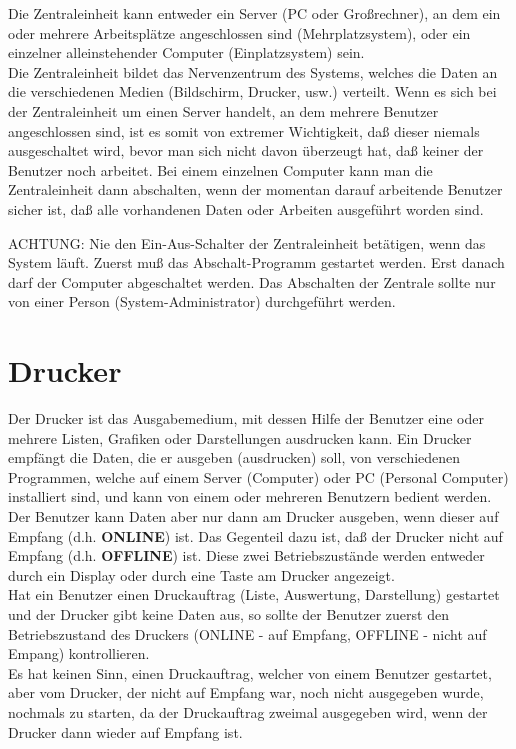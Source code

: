 Die Zentraleinheit kann entweder ein Server (PC oder Gro{\ss}rechner), an
dem ein oder mehrere Arbeitspl\"{a}tze angeschlossen sind (Mehrplatzsystem),
oder ein einzelner alleinstehender Computer (Einplatzsystem) sein.\\
Die Zentraleinheit bildet das Nervenzentrum des Systems, welches
die Daten an die verschiedenen Medien (Bildschirm, Drucker, usw.)
verteilt. Wenn es sich bei der Zentraleinheit um einen Server handelt, an dem
mehrere Benutzer angeschlossen sind, ist es somit von extremer Wichtigkeit, da{\ss} dieser niemals ausgeschaltet wird, bevor
man sich nicht davon \"{u}berzeugt hat, da{\ss} keiner der Benutzer noch
arbeitet. Bei einem einzelnen Computer kann man die Zentraleinheit
dann abschalten, wenn  der momentan darauf arbeitende Benutzer
sicher ist, da{\ss} alle vorhandenen Daten oder Arbeiten ausgef\"{u}hrt
worden sind.

\vspace{0.5cm}

\begin{bf}
\begin{it}
ACHTUNG: Nie den Ein-Aus-Schalter der Zentraleinheit bet\"{a}tigen, wenn
das System l\"{a}uft. Zuerst mu{\ss} das Abschalt-Programm gestartet werden.
Erst danach darf der Computer abgeschaltet werden. Das Abschalten der
Zentrale sollte nur von einer Person (System-Administrator) durchgef\"{u}hrt
werden.
\end{it}
\end{bf}

\section{Drucker} 

Der Drucker ist das Ausgabemedium, mit dessen Hilfe der Benutzer eine
oder mehrere Listen, Grafiken oder Darstellungen ausdrucken kann. Ein
Drucker empf\"{a}ngt die Daten, die er ausgeben (ausdrucken) soll, von
verschiedenen Programmen, welche auf einem Server (Computer) oder PC
(Personal Computer) installiert sind, und kann von einem oder mehreren
Benutzern bedient werden.\\
Der Benutzer kann Daten aber nur dann am Drucker ausgeben, wenn dieser
auf Empfang (d.h. {\bf ONLINE}) ist. Das Gegenteil dazu ist,
da{\ss} der Drucker nicht auf Empfang (d.h. {\bf OFFLINE}) ist. Diese zwei
Betriebszust\"{a}nde werden entweder durch ein Display oder durch eine
Taste am Drucker angezeigt.\\
Hat ein Benutzer einen Druckauftrag (Liste, Auswertung, Darstellung)
gestartet und der Drucker gibt keine Daten aus, so sollte der
Benutzer zuerst den Betriebszustand des Druckers (ONLINE - auf
Empfang, OFFLINE - nicht auf Empang) kontrollieren.\\
Es hat keinen Sinn, einen Druckauftrag, welcher von einem Benutzer
gestartet, aber vom Drucker, der nicht auf Empfang war, noch nicht ausgegeben
wurde, nochmals zu starten, da der Druckauftrag zweimal ausgegeben wird, wenn
der Drucker dann wieder auf Empfang ist.

